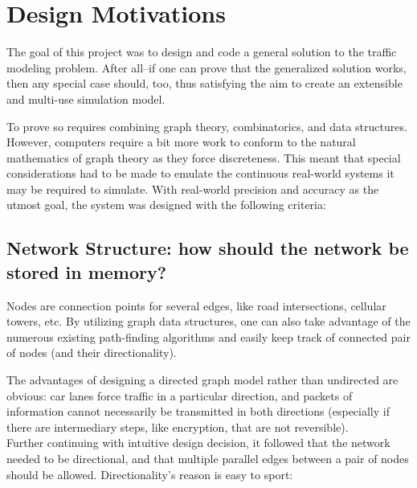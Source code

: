 \chapter{Design Motivations}
\label{Motivations}

\par The goal of this project was to design and code a general solution to the traffic modeling problem. After all--if one can prove that the generalized solution works, then any special case should, too, thus satisfying the aim to create an extensible and multi-use simulation model.  \\

\par   To prove so requires combining graph theory, combinatorics, and data structures. However, computers require a bit more work to conform to the natural mathematics of graph theory as they force discreteness.  This meant that special considerations had to be made to emulate the continuous real-world systems it may be required to simulate.  With real-world precision and accuracy as the utmost goal, the system was designed with the following criteria: \\


\section{Network Structure:  how should the network be stored in memory?}
\par Nodes are connection points for several edges, like road intersections, cellular towers, etc.  By utilizing graph data structures, one can also take advantage of the numerous existing path-finding algorithms and easily keep track of connected pair of nodes (and their directionality). \\

\par The advantages of designing a directed graph model rather than undirected are obvious:  car lanes force traffic in a particular direction, and packets of information cannot necessarily be transmitted in both directions (especially if there are intermediary steps, like encryption, that are not reversible). \\

Further continuing with intuitive design decision, it followed that the network needed to be directional, and that multiple parallel edges between a pair of nodes should be allowed.  Directionality's reason is easy to sport:   \\  


